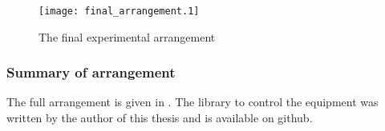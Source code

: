 \begin{centering}
\begin{figure}[h]%
    \texttt{[image: final\_arrangement.1]}
   \caption{
     The final experimental arrangement
   }
   \label{fig:exp:setup:electronic:final}
\end{figure}
\end{centering}





\subsubsection{Summary of arrangement}
The full arrangement is given in .
The library to control the equipment was written by the author of this thesis 
and is  available on github\cite{ExperimentCode}.


